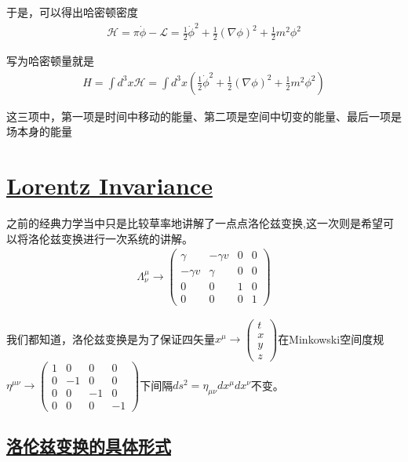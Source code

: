 于是，可以得出哈密顿密度
\begin{align*}
    \mathcal{H}=\pi\dot{\phi}-\mathcal{L}=\frac{1}{2}\dot{\phi}^2+\frac{1}{2}(\nabla\phi)^2+\frac{1}{2}m^2\phi^2
\end{align*}

写为哈密顿量就是
\begin{align*}
    H=\int d^3x \mathcal{H}=\int d^3x \left(\frac{1}{2}\dot{\phi}^2+\frac{1}{2}\left(\nabla\phi\right)^2+\frac{1}{2}m^2\phi^2\right)
\end{align*}

这三项中，第一项是时间中移动的能量、第二项是空间中切变的能量、最后一项是场本身的能量

\section{\protect\hyperlink{:}{Lorentz Invariance}}


之前的经典力学当中只是比较草率地讲解了一点点洛伦兹变换,这一次则是希望可以将洛伦兹变换进行一次系统的讲解。
\begin{align*}
    \varLambda_\nu^\mu\to
    \begin{pmatrix}
        \gamma&-\gamma v&0&0\\
        -\gamma v&\gamma&0&0\\
        0&0&1&0\\
        0&0&0&1   
    \end{pmatrix}
\end{align*}

我们都知道，洛伦兹变换是为了保证四矢量$x^\mu\to\begin{pmatrix}
    t\\x\\y\\z
\end{pmatrix}$在Minkowski空间度规$\eta^{\mu\nu}\to\begin{pmatrix}
    1&0&0&0\\
    0&-1&0&0\\
    0&0&-1&0\\
    0&0&0&-1
\end{pmatrix}$下间隔$ds^2=\eta_{\mu\nu}dx^\mu dx^\nu$不变。

\subsection{\protect\hyperlink{:}{洛伦兹变换的具体形式}}


